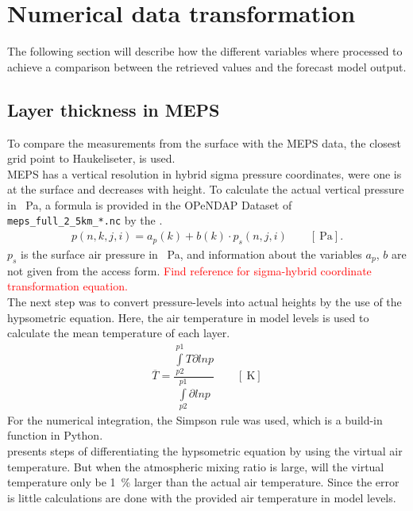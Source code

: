 \section{Numerical data transformation} \label{sec:data_proc}
The following section will describe how the different variables where processed to achieve a comparison between the retrieved values and the forecast model output. 

\subsection{Layer thickness in MEPS}\label{sec:layer_thickness}
To compare the measurements from the surface with the MEPS data, the closest grid point to Haukeliseter, is used.
\\
MEPS has a vertical resolution in hybrid sigma pressure coordinates, were one is at the surface and decreases with height. To calculate the actual vertical pressure in \SI{}{\Pa}, a formula is provided in the OPeNDAP Dataset of \texttt{meps\_full\_2\_5km\_*.nc} by the \cite{norwegian_meteorological_institute_met_2016}.  
\begin{align}
	p(n,k,j,i) = a_p(k) + b(k) \cdot p_s(n,j,i) \qquad [\SI{}{\Pa}].
	\label{eq:hybrid_sigma_pressure}
\end{align}
$p_s$ is the surface air pressure in \SI{}{\Pa}, and information about the variables $a_p$, $b$ are not given from the access form. \textcolor{red}{Find reference for sigma-hybrid coordinate transformation equation.}  
\\
The next step was to convert pressure-levels into actual heights by the use of the hypsometric equation. Here, the air temperature in model levels is used to calculate the mean temperature of each layer. 
\begin{align}
	\overline{T} = \dfrac{\int\limits_{p2}^{p1} T \partial ln p}{\int\limits_{p2}^{p1}\partial ln p} \qquad [\SI{}{\kelvin}]
	\label{eq:T_avg}
\end{align}
For the numerical integration, the Simpson rule was used, which is a build-in function in Python. \\
\cite{martin_mid-latitude_2006} presents steps of differentiating the hypsometric equation by using the virtual air temperature. But when the atmospheric mixing ratio is large, will the virtual temperature only be \SI{1}{\percent} larger than the actual air temperature. Since the error is little calculations are done with the provided air temperature in model levels.
